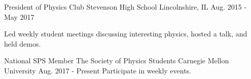 \begin{cventries}
  \cventry
    {President of Physics Club}
    {Stevenson High School}
    {Lincolnshire, IL}
    {Aug. 2015 - May 2017}
    {
      \begin{cvitems}
        \item {Led weekly student meetings discussing interesting physics, hosted a talk, and held demos.}
      \end{cvitems}
    }
  
  
  \cventry
  {National SPS Member}
  {The Society of Physics Students}
  {Carnegie Mellon University}
  {Aug. 2017 - Present}
  {Participate in weekly events.}
\end{cventries}
